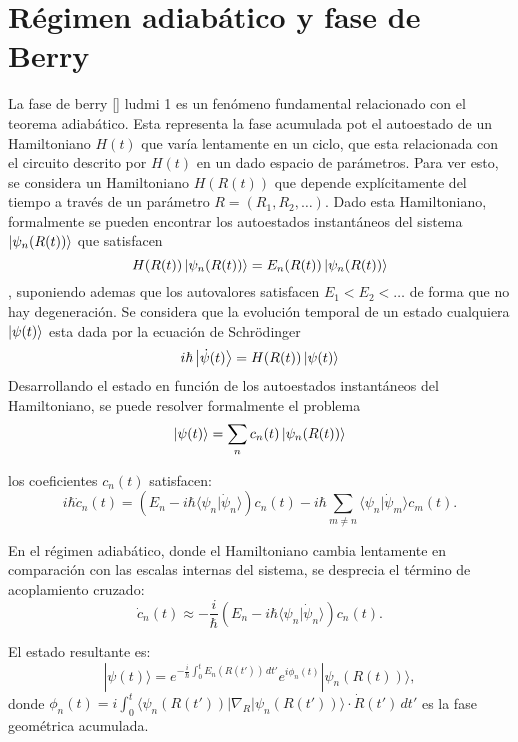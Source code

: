 \section{R\'egimen adiab\'atico y fase de Berry} \label{sec2:adiabatico}
La fase de berry \ref{} ludmi 1 es un fenómeno fundamental relacionado con el teorema adiab\'atico. Esta representa la fase acumulada pot el autoestado de un Hamiltoniano $H(t)$ que var\'ia lentamente en un ciclo, que esta relacionada con el circuito descrito por $H(t)$ en un dado espacio de par\'ametros. \newline
Para ver esto, se considera un Hamiltoniano $H(R(t))$ que depende explícitamente del tiempo a través de un parámetro $R=(R_1,R_2,\dots)$. Dado esta Hamiltoniano, formalmente se pueden encontrar los autoestados instantáneos del sistema $\ket{\psi_n(R(t))}$ que satisfacen
\begin{equation}
    H(R(t))\ket{\psi_n(R(t))}=E_n(R(t))\ket{\psi_n(R(t))}
\end{equation}
, suponiendo ademas que los autovalores satisfacen $E_1<E_2<\dots$ de forma que no hay degeneraci\'on. Se considera que la evoluci\'on temporal de un estado cualquiera $\ket{\psi(t)}$ esta dada por la ecuación de Schr\"odinger
\begin{equation}
    i \hbar \ket{\dot \psi(t)}=H(R(t))\ket{\psi(t)}
\end{equation}
Desarrollando el estado en funci\'on de los autoestados instantáneos del Hamiltoniano, se puede resolver formalmente el problema
\begin{equation}
    \ket{\psi(t)} = \sum_n c_n(t)\ket{\psi_n(R(t))}
\end{equation}

los coeficientes \( c_n(t) \) satisfacen:
\[
i \hbar \dot{c}_n(t) = \left( E_n - i \hbar \langle \psi_n | \dot{\psi}_n \rangle \right) c_n(t) - i \hbar \sum_{m \neq n} \langle \psi_n | \dot{\psi}_m \rangle c_m(t).
\]

En el régimen adiabático, donde el Hamiltoniano cambia lentamente en comparación con las escalas internas del sistema, se desprecia el término de acoplamiento cruzado:
\[
\dot{c}_n(t) \approx -\frac{i}{\hbar} \left( E_n - i \hbar \langle \psi_n | \dot{\psi}_n \rangle \right) c_n(t).
\]

El estado resultante es:
\[
| \psi(t) \rangle = e^{-\frac{i}{\hbar} \int_0^t E_n(R(t')) \, dt'} e^{i \phi_n(t)} | \psi_n(R(t)) \rangle,
\]
donde \( \phi_n(t) = i \int_0^t \langle \psi_n(R(t')) | \nabla_R | \psi_n(R(t')) \rangle \cdot \dot{R}(t') \, dt' \) es la fase geométrica acumulada.

